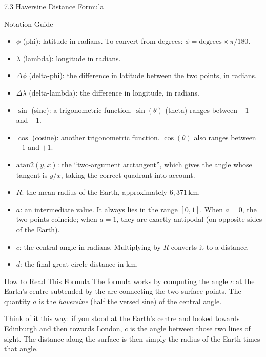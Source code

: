 \documentclass[aspectratio=169,10pt]{beamer}
\begin{document}
\begin{frame}[allowframebreaks]{7.3 Haversine Distance Formula}
  \begin{block}{Notation Guide}
    \begin{itemize}
      \item $\phi$ (phi): latitude in radians.  To convert from
            degrees: $\phi = \text{degrees} \times \pi / 180$.
      \item $\lambda$ (lambda): longitude in radians.
      \item $\Delta\phi$ (delta-phi): the difference in latitude
            between the two points, in radians.
      \item $\Delta\lambda$ (delta-lambda): the difference in longitude,
            in radians.
      \item $\sin$ (sine): a trigonometric function.
            $\sin(\theta)$ (theta) ranges between $-1$ and $+1$.
      \item $\cos$ (cosine): another trigonometric function.
            $\cos(\theta)$ also ranges between $-1$ and $+1$.
      \item $\mathrm{atan2}(y, x)$: the ``two-argument arctangent'',
            which gives the angle whose tangent is $y/x$, taking
            the correct quadrant into account.
      \item $R$: the mean radius of the Earth, approximately
            $6{,}371$\,km.
      \item $a$: an intermediate value.  It always lies in the range
            $[0, 1]$.  When $a = 0$, the two points coincide; when
            $a = 1$, they are exactly antipodal (on opposite sides
            of the Earth).
      \item $c$: the central angle in radians.  Multiplying by $R$
            converts it to a distance.
      \item $d$: the final great-circle distance in km.
    \end{itemize}
  \end{block}

  \framebreak

  \begin{alertblock}{How to Read This Formula}
    The formula works by computing the angle $c$ at the Earth's centre
    subtended by the arc connecting the two surface points.
    The quantity $a$ is the \emph{haversine} (half the versed sine)
    of the central angle.

    Think of it this way: if you stood at the Earth's centre and
    looked towards Edinburgh and then towards London, $c$ is the angle
    between those two lines of sight.  The distance along the surface
    is then simply the radius of the Earth times that angle.


\end{alertblock}
\end{frame}
\end{document}
